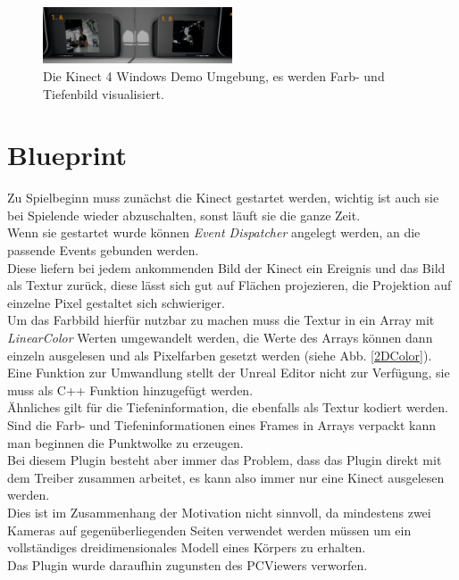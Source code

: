 \documentclass[a4paper]{IEEEtran}
\begin{document}
	\begin{figure}[!h]
    	\centering
		\includegraphics[width=0.5\textwidth]{img/Kinect4Windows}
	    \caption{Die Kinect 4 Windows Demo Umgebung, es werden Farb- und Tiefenbild visualisiert.}
    	\label{Kinect4Windows}
	\end{figure}

\section{Blueprint}
	Zu Spielbeginn muss zunächst die Kinect gestartet werden, wichtig ist auch sie bei Spielende wieder abzuschalten, sonst läuft sie die ganze Zeit. \\
	Wenn sie gestartet wurde können {\textit{Event Dispatcher}} angelegt werden, an die passende Events gebunden werden. \\
	Diese liefern bei jedem ankommenden Bild der Kinect ein Ereignis und das Bild als Textur zurück, diese lässt sich gut auf Flächen projezieren, die Projektion auf einzelne Pixel gestaltet sich schwieriger. \\
	Um das Farbbild hierfür nutzbar zu machen muss die Textur in ein Array mit {\textit{LinearColor}} Werten umgewandelt werden, die Werte des Arrays können dann einzeln ausgelesen und als Pixelfarben gesetzt werden (siehe Abb. \ref{2DColor}). \\
	Eine Funktion zur Umwandlung stellt der Unreal Editor nicht zur Verfügung, sie muss als C++ Funktion hinzugefügt werden. \\
	Ähnliches gilt für die Tiefeninformation, die ebenfalls als Textur kodiert werden. \\
	Sind die Farb- und Tiefeninformationen eines Frames in Arrays verpackt kann man beginnen die Punktwolke zu erzeugen.\\
	Bei diesem Plugin besteht aber immer das Problem, dass das Plugin direkt mit dem Treiber zusammen arbeitet, es kann also immer nur eine Kinect ausgelesen werden. \\
	Dies ist im Zusammenhang der Motivation nicht sinnvoll, da mindestens zwei Kameras auf gegenüberliegenden Seiten verwendet werden müssen um ein vollständiges dreidimensionales Modell eines Körpers zu erhalten.\\
	Das Plugin wurde daraufhin zugunsten des PCViewers verworfen.\\
\end{document}
